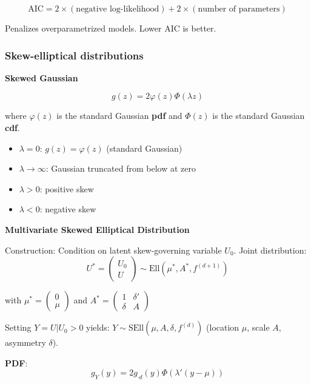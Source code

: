 \documentclass[12pt,a4paper]{article}
\begin{document}
\[
\text{AIC} = 2 \times (\text{negative log-likelihood}) + 2 \times (\text{number of parameters})
\]

Penalizes overparametrized models. Lower AIC is better.


\vspace{0.5em}

\subsubsection{Skew-elliptical distributions}

\textbf{Skewed Gaussian}

\[
g(z) = 2\varphi(z)\Phi(\lambda z)
\]

where $\varphi(z)$ is the standard Gaussian \textbf{pdf} and $\Phi(z)$ is the standard Gaussian \textbf{cdf}.

\begin{itemize}
    \item $\lambda = 0$: $g(z) = \varphi(z)$ (standard Gaussian)
    \item $\lambda \to \infty$: Gaussian truncated from below at zero
    \item $\lambda > 0$: positive skew
    \item $\lambda < 0$: negative skew
\end{itemize}

\vspace{0.5em}

\textbf{Multivariate Skewed Elliptical Distribution}

Construction: Condition on latent skew-governing variable $U_0$. Joint distribution:
\[
U^* = \begin{pmatrix} U_0 \\ U \end{pmatrix} \sim \text{Ell}(\mu^*, A^*, f^{(d+1)})
\]

with $\mu^* = \begin{pmatrix} 0 \\ \mu \end{pmatrix}$ and $A^* = \begin{pmatrix} 1 & \delta' \\ \delta & A \end{pmatrix}$

Setting $Y = U | U_0 > 0$ yields: $Y \sim \text{SEll}(\mu, A, \delta, f^{(d)})$ (location $\mu$, scale $A$, asymmetry $\delta$).

\textbf{PDF}:
\[
g_Y(y) = 2 g_{\cdot d}(y) \Phi(\lambda'(y - \mu))
\]
\end{document}
